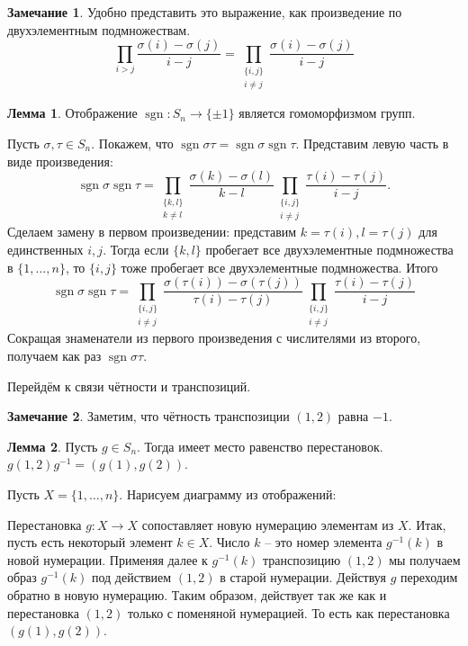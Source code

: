 \documentclass[10pt,a4paper,oneside]{book}
\theoremstyle{definition}
\newtheorem*{rem}{\color{green!50!blue}Замечание}
\newtheorem{lem}{\color{green!50!black}Лемма}
\newcommand{\sgn}{\operatorname{sgn}}
\def\lm{\begin{lem}}
\def\elm{\end{lem}}
\def\rm{\begin{rem}}
\def\erm{\end{rem}}
\begin{document}
\rm Удобно представить это выражение, как произведение по двухэлементным подмножествам.
$$\prod_{i>j} \frac{\sigma(i)-\sigma(j)}{i-j}=\prod_{\substack{\{i,j\}\\ i\neq j}} \frac{\sigma(i)-\sigma(j)}{i-j}$$
\erm
 

\lm Отображение $\sgn \colon S_n \to \{\pm 1\}$ является гомоморфизмом групп.
\elm
\proof Пусть $\sigma, \tau \in S_n$. Покажем, что $\sgn \sigma \tau = \sgn \sigma \sgn \tau$. Представим левую часть в виде произведения:
$$\sgn \sigma \sgn \tau= \prod_{\substack{\{k,l\}\\ k\neq l}} \frac{\sigma(k)-\sigma(l)}{k-l} \prod_{\substack{\{i,j\}\\ i\neq j}} \frac{\tau(i)-\tau(j)}{i-j}.$$
Сделаем замену в первом произведении: представим $k=\tau(i),l=\tau(j)$ для единственных $i,j$. Тогда если $\{k,l\}$ пробегает  все двухэлементные подмножества в $\{1,\dots,n\}$, то $\{i,j\}$ тоже пробегает все двухэлементные подмножества. Итого
$$\sgn \sigma \sgn \tau=\prod_{\substack{\{i,j\}\\ i\neq j}} \frac{\sigma(\tau(i))-\sigma(\tau(j))}{\tau(i)-\tau(j)} \prod_{\substack{\{i,j\}\\ i\neq j}} \frac{\tau(i)-\tau(j)}{i-j}$$
Сокращая знаменатели из первого произведения с числителями из второго, получаем как раз $\sgn \sigma \tau$.
\endproof

Перейдём к связи чётности и транспозиций.

\rm Заметим, что чётность транспозиции $(1,2)$ равна $-1$.
\erm

\lm Пусть $g\in S_n$. Тогда имеет место равенство перестановок. $g(1,2)g^{-1}=(g(1),g(2))$.
\elm
\proof Пусть $X=\{1,\dots,n\}$. Нарисуем диаграмму из отображений:
\begin{center}
\end{center}
Перестановка $g\colon X \to X$ сопоставляет новую нумерацию элементам из $X$. Итак, пусть есть некоторый элемент $k\in X$. Число $k$ -- это номер элемента $g^{-1}(k)$ в новой нумерации. Применяя далее к $g^{-1}(k)$ транспозицию $(1,2)$ мы получаем образ $g^{-1}(k)$ под действием $(1,2)$ в старой нумерации. Действуя $g$ переходим обратно в новую нумерацию. 
Таким образом, действует так же как и перестановка $(1,2)$ только с поменяной нумерацией. То есть как перестановка $(g(1),g(2))$.
\endproof
\end{document}
